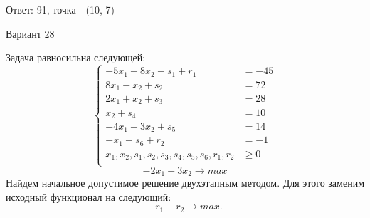 \documentclass{article}%
\begin{document}
\begin{flushright}%
Ответ: 91, точка {-} (10, 7)%
\end{flushright}%
\newpage%
\begin{center}%
\begin{Huge}%
Вариант 28%
\end{Huge}%
\end{center}%
Задача равносильна следующей: %
\[%
\left\{\begin{aligned}-5x_{1}-8x_{2}-s_{1}+r_{1} & =-45 \\8x_{1}-x_{2}+s_{2} & =72 \\2x_{1}+x_{2}+s_{3} & =28 \\x_{2}+s_{4} & =10 \\-4x_{1}+3x_{2}+s_{5} & =14 \\-x_{1}-s_{6}+r_{2} & =-1 \\x_{1},x_{2},s_{1},s_{2},s_{3},s_{4},s_{5},s_{6},r_{1},r_{2} & \ge 0 \\ \end{aligned}\right.%
\]%
\[%
-2x_{1}+3x_{2}  \to max%
\]%
Найдем начальное допустимое решение двухэтапным методом. Для этого заменим исходный функционал на следующий: %
\[%
-r_{1}-r_{2}\to max.%
\]%
\end{document}
